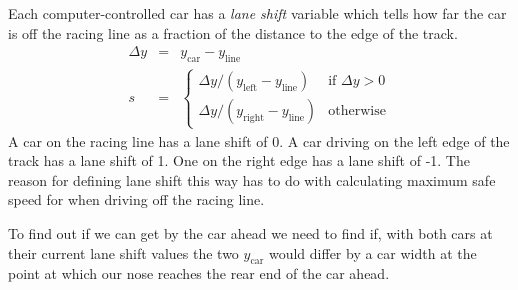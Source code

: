 \documentclass{article}
\begin{document}
Each
computer-controlled car has a {\em lane shift} variable which tells how far the
car is off the racing line as a fraction of the distance to the edge of the
track. 
\begin{eqnarray}
  \Delta y & = & y_\mathrm{car} - y_\mathrm{line} \\
  s & = & \left\{ \begin{array}{ll}
        \Delta y / (y_\mathrm{left} - y_\mathrm{line}) & \mbox{if $\Delta y > 0$} \\
      \Delta y / (y_\mathrm{right} - y_\mathrm{line}) & \mbox{otherwise}
    \end{array}
    \right.
\end{eqnarray}
A car on the racing line has a lane shift of 0. A car driving on the left edge
of the track has a lane shift of 1. One on the right edge has a lane shift of
-1. The reason for defining lane shift this way has to do with calculating
maximum safe speed for when driving off the racing line.

To find out if we can get by the car ahead we need to find if, with both cars at
their current lane shift values the two $y_\mathrm{car}$ would differ by a car
width at the point at which our nose reaches the rear end of the car ahead.
\end{document}
